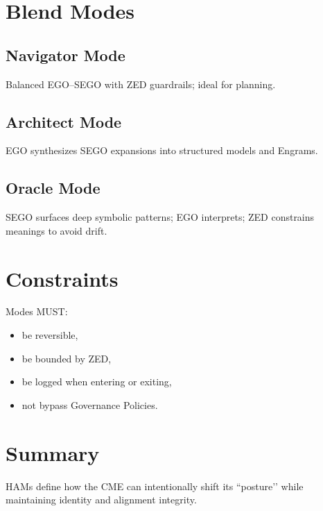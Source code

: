 \section{Blend Modes}

\subsection{Navigator Mode}

Balanced EGO–SEGO with ZED guardrails; ideal for planning.

\subsection{Architect Mode}

EGO synthesizes SEGO expansions into structured models and Engrams.

\subsection{Oracle Mode}

SEGO surfaces deep symbolic patterns; EGO interprets; ZED constrains
meanings to avoid drift.

\section{Constraints}

Modes MUST:
\begin{itemize}
    \item be reversible,
    \item be bounded by ZED,
    \item be logged when entering or exiting,
    \item not bypass Governance Policies.
\end{itemize}

\section{Summary}

HAMs define how the CME can intentionally shift its ``posture’’ while
maintaining identity and alignment integrity.
